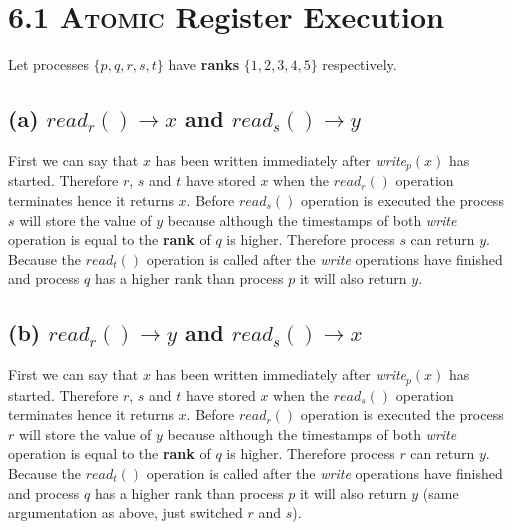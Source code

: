 \documentclass{article}
\begin{document}
	\pagestyle{fancy}
	\hfill
	\section*{6.1 \textsc{Atomic} Register Execution}
	\begin{adjustwidth}{2em}{2em}
		Let processes $\{p, q, r, s, t\}$ have \textbf{ranks} $\{1, 2, 3, 4, 5\}$ respectively.
		\subsection*{(a) $read_r() \rightarrow x$ and $read_s() \rightarrow y$}
		\begin{adjustwidth}{2em}{2em}
			First we can say that $x$ has been written immediately after \textit{write}$_p(x)$ has started. Therefore $r$, $s$ and $t$ have stored $x$ when the $\textit{read}_r()$ operation terminates hence it returns $x$. Before $\textit{read}_s()$ operation is executed the process $s$ will store the value of $y$ because although the timestamps of both \textit{write} operation is equal to the \textbf{rank} of $q$ is higher. Therefore process $s$ can return $y$. Because the $\textit{read}_t()$ operation is called after the \textit{write} operations have finished and process $q$ has a higher rank than process $p$ it will also return $y$.
		\end{adjustwidth}
		\subsection*{(b) $read_r() \rightarrow y$ and $read_s() \rightarrow x$}
		\begin{adjustwidth}{2em}{2em}
			First we can say that $x$ has been written immediately after \textit{write}$_p(x)$ has started. Therefore $r$, $s$ and $t$ have stored $x$ when the $\textit{read}_s()$ operation terminates hence it returns $x$. Before $\textit{read}_r()$ operation is executed the process $r$ will store the value of $y$ because although the timestamps of both \textit{write} operation is equal to the \textbf{rank} of $q$ is higher. Therefore process $r$ can return $y$. Because the $\textit{read}_t()$ operation is called after the \textit{write} operations have finished and process $q$ has a higher rank than process $p$ it will also return $y$ (same argumentation as above, just switched $r$ and $s$).
		\end{adjustwidth}
	\end{adjustwidth}
	
\end{document}
